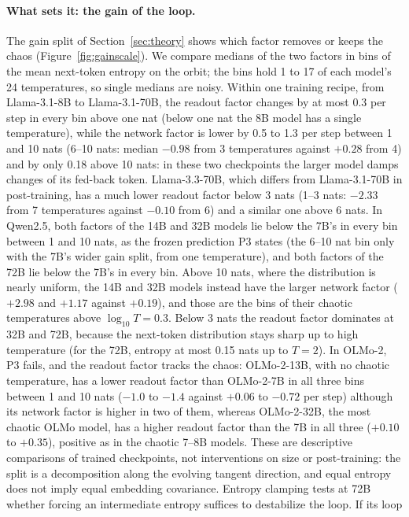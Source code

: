 \documentclass[11pt,letterpaper]{article}
\begin{document}
\paragraph{What sets it: the gain of the loop.} The gain split of Section~\ref{sec:theory} shows which factor removes or
keeps the chaos (Figure~\ref{fig:gainscale}). We compare medians of the two factors in bins of the mean next-token
entropy on the orbit; the bins hold 1 to 17 of each model's 24 temperatures, so single medians are noisy. Within one
training recipe, from Llama-3.1-8B to Llama-3.1-70B, the readout factor changes by at most 0.3 per step in every bin
above one nat (below one nat the 8B model has a single temperature), while the network factor is lower by 0.5 to 1.3
per step between 1 and 10 nats (6--10 nats: median $-0.98$ from 3 temperatures against $+0.28$ from 4) and by only
0.18 above 10 nats: in these two checkpoints the larger model damps changes of its fed-back token. Llama-3.3-70B, which
differs from Llama-3.1-70B in post-training, has a much lower readout factor below 3 nats (1--3 nats: $-2.33$ from 7
temperatures against $-0.10$ from 6) and a similar one above 6 nats. In Qwen2.5, both factors of the 14B and 32B
models lie below the 7B's in every bin between 1 and 10 nats, as the frozen prediction P3 states (the 6--10 nat bin
only with the 7B's wider gain split, from one temperature), and both factors of
the 72B lie below the 7B's in every bin. Above 10 nats, where the distribution is nearly uniform, the 14B and 32B
models instead have the larger network factor ($+2.98$ and $+1.17$ against $+0.19$), and those are the bins of their
chaotic temperatures above $\log_{10}T=0.3$. Below 3 nats the readout factor dominates at 32B and 72B, because the
next-token distribution stays sharp up to high temperature (for the 72B, entropy at most 0.15 nats up to $T=2$). In
OLMo-2, P3 fails, and the readout factor tracks the chaos: OLMo-2-13B, with no chaotic temperature, has a lower
readout factor than OLMo-2-7B in all three bins between 1 and 10 nats ($-1.0$ to $-1.4$ against $+0.06$ to $-0.72$
per step) although its network factor is higher in two of them, whereas OLMo-2-32B, the most chaotic OLMo model, has a
higher readout factor than the 7B in all three ($+0.10$ to $+0.35$), positive as in the chaotic 7--8B models. These
are descriptive comparisons of trained checkpoints, not interventions on size or post-training: the split is a
decomposition along the evolving tangent direction, and equal entropy does not imply equal embedding covariance.
Entropy clamping tests at 72B whether forcing an intermediate entropy suffices to destabilize the loop. If its loop
\end{document}
